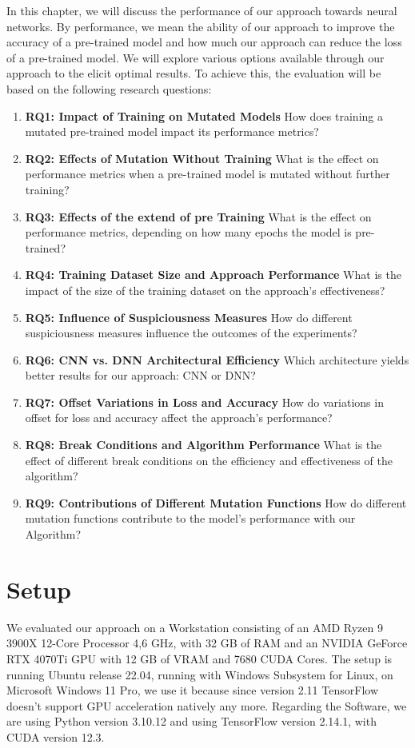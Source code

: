 In this chapter, we will discuss the performance of our approach towards neural networks.
By performance, we mean the ability of our approach to improve the accuracy of a pre-trained model and how much our approach can reduce the loss of a pre-trained model.
We will explore various options available through our approach to the elicit optimal results.
To achieve this, the evaluation will be based on the following research questions:
\begin{enumerate}
    \item[]\textbf{RQ1: Impact of Training on Mutated Models} How does training a mutated pre-trained model impact its performance metrics?
    \item[]\textbf{RQ2: Effects of Mutation Without Training} What is the effect on performance metrics when a pre-trained model is mutated without further training?
    \item[]\textbf{RQ3: Effects of the extend of pre Training} What is the effect on performance metrics, depending on how many epochs the model is pre-trained?
    \item[]\textbf{RQ4: Training Dataset Size and Approach Performance} What is the impact of the size of the training dataset on the approach's effectiveness?
    \item[]\textbf{RQ5: Influence of Suspiciousness Measures} How do different suspiciousness measures influence the outcomes of the experiments?
    \item[]\textbf{RQ6: CNN vs. DNN Architectural Efficiency} Which architecture yields better results for our approach: CNN or DNN?
    \item[]\textbf{RQ7: Offset Variations in Loss and Accuracy} How do variations in offset for loss and accuracy affect the approach's performance?
    \item[]\textbf{RQ8: Break Conditions and Algorithm Performance} What is the effect of different break conditions on the efficiency and effectiveness of the algorithm?
    \item[]\textbf{RQ9: Contributions of Different Mutation Functions} How do different mutation functions contribute to the model's performance with our Algorithm?
\end{enumerate}
\section{Setup}\label{sec:setup}

We evaluated our approach on a Workstation consisting of an AMD Ryzen 9 3900X 12-Core Processor 4,6 GHz, with 32 GB of RAM and an NVIDIA GeForce RTX 4070Ti GPU with 12 GB of VRAM and 7680 CUDA Cores.
The setup is running Ubuntu release 22.04, running with Windows Subsystem for Linux, on Microsoft Windows 11 Pro, we use it because since version 2.11\cite{noauthor_build_2023} TensorFlow doesn't support GPU acceleration natively any more.
Regarding the Software, we are using Python version 3.10.12 and using TensorFlow version 2.14.1, with CUDA version 12.3.

